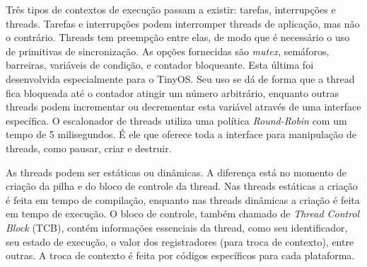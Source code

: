 \documentclass[a4paper,onecolumn, 10pt]{article}
\begin{document}

Três tipos de contextos de execução passam a existir: tarefas, interrupções e threads. Tarefas e interrupções podem
interromper threads de aplicação, mas não o contrário. Threads tem preempção entre elas, 
de modo que é necessário o uso de primitivas de sincronização. 
As opções fornecidas são \textit{mutex}, semáforos, barreiras, variáveis de condição, e contador
bloqueante. Esta última foi desenvolvida especialmente para o TinyOS. Seu uso se dá de forma que a thread fica bloqueada
até o contador atingir um número arbitrário, enquanto outras threads podem incrementar ou decrementar esta variável
através de uma interface específica.
O escalonador de threads utiliza uma política \textit{Round-Robin} com um tempo de 5 milisegundos. É ele que oferece
toda a interface para manipulação de threads, como pausar, criar e destruir. 

As threads podem ser estáticas ou dinâmicas. A diferença está no momento de criação da pilha e do bloco de controle da
thread. Nas threads estáticas a criação é feita em tempo de compilação, enquanto nas threads dinâmicas 
a criação é feita em tempo de execução. O bloco de controle, também chamado de
\textit{Thread Control Block} (TCB), contém informações essenciais da thread, como seu identificador, seu estado de
execução, o valor dos registradores (para troca de contexto), entre outras\cite{TEP134}.
A troca de contexto é feita por códigos específicos para cada plataforma. 
\end{document}
